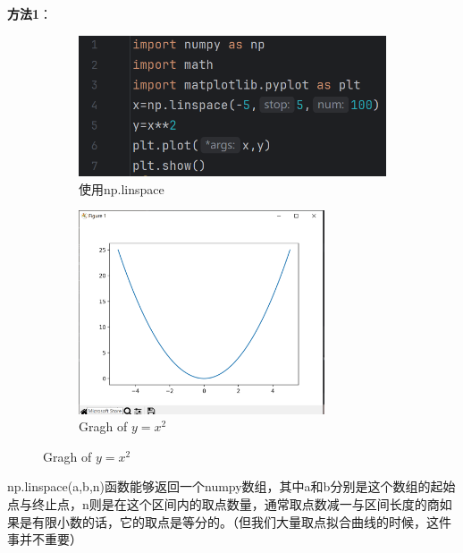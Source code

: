 \documentclass[12pt]{article}
\begin{document}
\textbf{\large 方法1}：
\begin{figure}[H]
    \centering
    \begin{subfigure}[b]{0.45\textwidth}
        \includegraphics[width=1.2\textwidth,height=0.6\textwidth]{线图2.png}
        \caption{使用np.linspace}
        \label{fig:enter-label-1}
    
    \end{subfigure}
    \hfill        
    \begin{subfigure}[b]{0.45\textwidth}
        \includegraphics[width=0.8\textwidth]{线图 pic2.png}
        \caption{Gragh of \(y=x^2\)}
        \label{fig:enter-label-2}
    \end{subfigure}
\end{figure}

np.linspace(a,b,n)函数能够返回一个numpy数组，其中a和b分别是这个数组的起始点与终止点，n则是在这个区间内的取点数量，通常取点数减一与区间长度的商如果是有限小数的话，它的取点是等分的。（但我们大量取点拟合曲线的时候，这件事并不重要）
\end{document}
